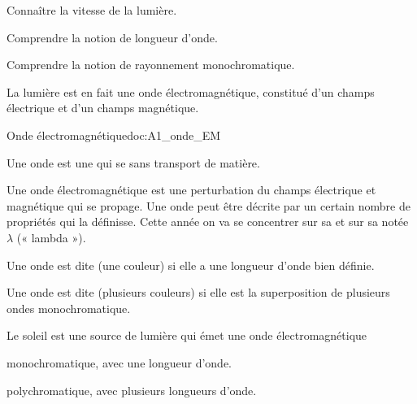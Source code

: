 \teteSndLumi

\vspace*{-30pt}


\begin{objectifs}
  \item Connaître la vitesse de la lumière.
  \item Comprendre la notion de longueur d'onde.
  \item Comprendre la notion de rayonnement monochromatique.
\end{objectifs}

\begin{contexte}
  La lumière est en fait une onde électromagnétique, constitué d'un champs électrique et d'un champs magnétique.
  
\end{contexte}


\begin{doc}{Onde électromagnétique}{doc:A1_onde_EM}
  \begin{importants}
    Une onde est une  qui se  sans transport de matière.
  \end{importants}
  
  Une onde électromagnétique est une perturbation du champs électrique et magnétique qui se propage.
  Une onde peut être décrite par un certain nombre de propriétés qui la définisse.
  Cette année on va se concentrer sur sa  et sur sa  notée $\lambda$ (« lambda »).
  
  \begin{importants}
    Une onde est dite  (une couleur) si elle a une longueur d'onde bien définie.
    
    Une onde est dite  (plusieurs couleurs) si elle est la superposition de plusieurs ondes monochromatique.
  \end{importants}
\end{doc}


\numeroQuestion
Le soleil est une source de lumière qui émet une onde électromagnétique
\vspace*{-2pt}
\begin{qcm}
  \item monochromatique, avec une longueur d'onde.
  \item polychromatique, avec plusieurs longueurs d'onde.
\end{qcm}

